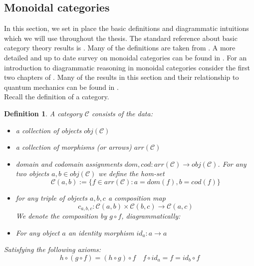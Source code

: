 \documentclass{article}
\newtheorem{definition}{Definition}
\newcommand{\cat}{\mathcal{C}}
\begin{document}
\subsection{Monoidal categories}
In this section, we set in place the basic definitions and diagrammatic  intuitions which we will use throughout the thesis. The standard reference about basic category theory results is \cite{MacLane71}. Many of the definitions are taken from \cite{Abramsky11}. A more detailed and up to date survey on monoidal categories can be found in \cite{Etingof15}. For an introduction to diagrammatic reasoning in monoidal categories consider the first two chapters of \cite{Coecke17}. Many of the results in this section and their relationship to quantum mechanics can be found in \cite{Vicary12}. \\
Recall the definition of a category.
\begin{definition}
	A category $\cat$ consists of the data:
	\begin{itemize}
		\item a collection of objects $obj(\cat)$ 
		\item a collection of morphisms (or arrows) $arr(\cat)$
		\item domain and codomain assignments $dom, cod: arr(\cat) \rightarrow obj(\cat)$. For any two objects $a,b \in obj(\cat)$ we define the hom-set 
		$$ \cat (a,b) := \{ f \in arr(\cat) : a= dom(f), b=cod(f) \}$$
		\item for any triple of objects $a,b,c$ a composition map 
		$$c_{a,b,c}: \cat (a,b) \times \cat (b,c) \rightarrow \cat (a,c)$$
		We denote the composition by $g \circ f$, diagrammatically:
		\begin{center}
		\end{center}
		\item For any object $a$ an identity morphism $id_a: a \rightarrow a$ 
	\end{itemize}
	Satisfying the following axioms:
	\begin{equation*}
		h \circ (g \circ f) = (h \circ g) \circ f \quad f \circ id_a = f = id_b \circ f
	\end{equation*}
	
\end{definition}
\end{document}

